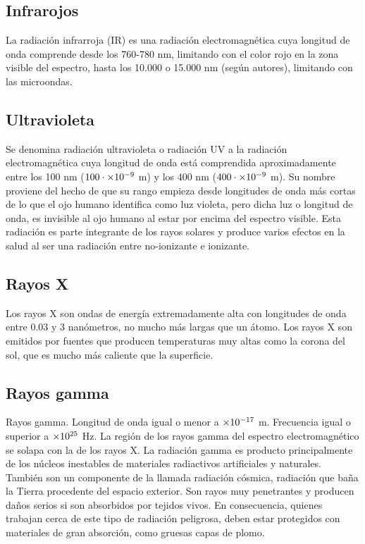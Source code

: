\documentclass[
	12pt, %
	fleqn, %
	a4paper, %
	oneside, %
]{LegrandOrangeBook}
\begin{document}
\subsection*{Infrarojos}
La radiación infrarroja (IR) es una radiación electromagnética cuya longitud de onda comprende desde los 760-780 nm, limitando con el color rojo en la zona visible del espectro, hasta los 10.000 o 15.000 nm (según autores), limitando con las microondas. 
\subsection*{Ultravioleta}
Se denomina radiación ultravioleta o radiación UV a la radiación electromagnética cuya longitud de onda está comprendida aproximadamente entre los 100 nm ($100\cdot\times 10^{-9}$ m) y los 400 nm ($400\cdot\times 10^{-9}$ m). Su nombre proviene del hecho de que su rango empieza desde longitudes de onda más cortas de lo que el ojo humano identifica como luz violeta, pero dicha luz o longitud de onda, es invisible al ojo humano al estar por encima del espectro visible. Esta radiación es parte integrante de los rayos solares y produce varios efectos en la salud al ser una radiación entre no-ionizante e ionizante.
\subsection*{Rayos X}
Los rayos X son ondas de energía extremadamente alta con longitudes de onda entre 0.03 y 3 nanómetros, no mucho más largas que un átomo. Los rayos X son emitidos por fuentes que producen temperaturas muy altas como la corona del sol, que es mucho más caliente que la superficie.
\subsection*{Rayos gamma}
Rayos gamma. Longitud de onda igual o menor a $\times 10^{-17}$ m. Frecuencia igual o superior a $\times 10^{25}$ Hz. La región de los rayos gamma del espectro electromagnético se solapa con la de los rayos X. La radiación gamma es producto principalmente de los núcleos inestables de materiales radiactivos artificiales y naturales. También son un componente de la llamada radiación cósmica, radiación que baña la Tierra procedente del espacio exterior. Son rayos muy penetrantes y producen daños serios si son absorbidos por tejidos vivos. En consecuencia, quienes trabajan cerca de este tipo de radiación peligrosa, deben estar protegidos con materiales de gran absorción, como gruesas capas de plomo.
\end{document}

